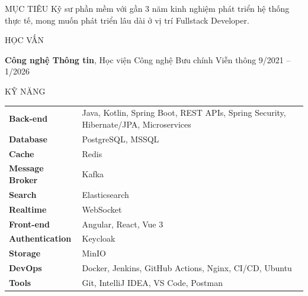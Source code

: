 \documentclass{resume}
\begin{document}
    
\begin{rSection}{MỤC TIÊU}
Kỹ sư phần mềm với gần 3 năm kinh nghiệm phát triển hệ thống thực tế, mong muốn phát triển lâu dài ở vị trí Fullstack Developer.
\end{rSection}


\begin{rSection}{HỌC VẤN}

\textbf{Công nghệ Thông tin}, Học viện Công nghệ Bưu chính Viễn thông \hfill 9/2021 -- 1/2026\\

\end{rSection}

\begin{rSection}{KỸ NĂNG}

\begin{tabular}{ @{} >{\bfseries}p{} p{} }
Back-end & Java, Kotlin, Spring Boot, REST APIs, Spring Security, Hibernate/JPA, Microservices\\
Database & PostgreSQL, MSSQL\\
Cache & Redis\\
Message Broker & Kafka\\
Search & Elasticsearch\\
Realtime & WebSocket\\
Front-end & Angular, React, Vue 3\\
Authentication & Keycloak\\
Storage & MinIO\\
DevOps & Docker, Jenkins, GitHub Actions, Nginx, CI/CD, Ubuntu\\
Tools & Git, IntelliJ IDEA, VS Code, Postman\\
\end{tabular}\\
\end{rSection}
\end{document}
